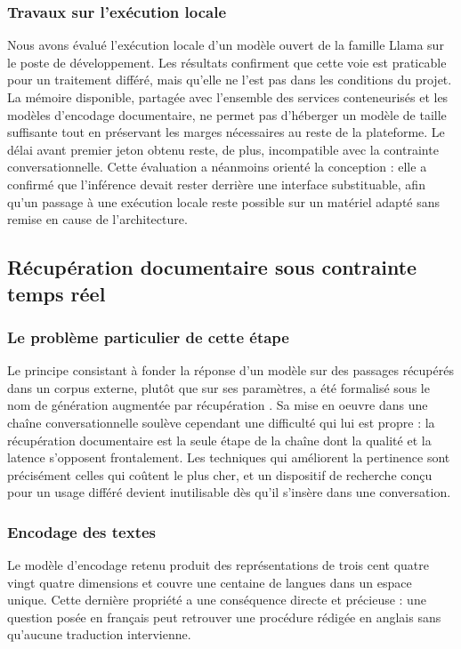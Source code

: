 \subsubsection{Travaux sur l'exécution locale}

Nous avons évalué l'exécution locale d'un modèle ouvert de la famille Llama sur le poste de développement. Les résultats confirment que cette voie est praticable pour un traitement différé, mais qu'elle ne l'est pas dans les conditions du projet. La mémoire disponible, partagée avec l'ensemble des services conteneurisés et les modèles d'encodage documentaire, ne permet pas d'héberger un modèle de taille suffisante tout en préservant les marges nécessaires au reste de la plateforme. Le délai avant premier jeton obtenu reste, de plus, incompatible avec la contrainte conversationnelle. Cette évaluation a néanmoins orienté la conception : elle a confirmé que l'inférence devait rester derrière une interface substituable, afin qu'un passage à une exécution locale reste possible sur un matériel adapté sans remise en cause de l'architecture.

\subsection{Récupération documentaire sous contrainte temps réel}

\subsubsection{Le problème particulier de cette étape}

Le principe consistant à fonder la réponse d'un modèle sur des passages récupérés dans un corpus externe, plutôt que sur ses paramètres, a été formalisé sous le nom de génération augmentée par récupération \cite{lewis}. Sa mise en oeuvre dans une chaîne conversationnelle soulève cependant une difficulté qui lui est propre : la récupération documentaire est la seule étape de la chaîne dont la qualité et la latence s'opposent frontalement. Les techniques qui améliorent la pertinence sont précisément celles qui coûtent le plus cher, et un dispositif de recherche conçu pour un usage différé devient inutilisable dès qu'il s'insère dans une conversation.

\subsubsection{Encodage des textes}

Le modèle d'encodage retenu \cite{e5} produit des représentations de trois cent quatre vingt quatre dimensions et couvre une centaine de langues dans un espace unique. Cette dernière propriété a une conséquence directe et précieuse : une question posée en français peut retrouver une procédure rédigée en anglais sans qu'aucune traduction intervienne.

